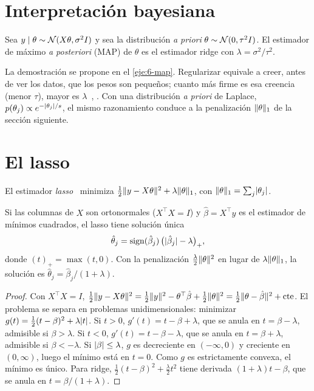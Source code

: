 \section{Interpretación bayesiana}

\begin{proposicion}\label{prop:map}
Sea $y\mid\theta\sim\mathcal{N}(X\theta,\sigma^{2}I)$ y sea la distribución \emph{a priori} $\theta\sim\mathcal{N}(0,\tau^{2}I)$. El estimador de máximo \emph{a posteriori} (MAP) de $\theta$ es el estimador ridge con $\lambda=\sigma^{2}/\tau^{2}$.
\end{proposicion}

La demostración se propone en el \cref{eje:6-map}. Regularizar equivale a creer, antes de ver los datos, que los pesos son pequeños; cuanto más firme es esa creencia (menor $\tau$), mayor es $\lambda$~\cite[§9.4]{cs229}, \cite[§3.1.4]{bishop}. Con una distribución \emph{a priori} de Laplace, $p(\theta_j)\propto e^{-\lvert\theta_j\rvert/s}$, el mismo razonamiento conduce a la penalización $\lVert\theta\rVert_1$ de la sección siguiente.

\section{El lasso}

\begin{definicion}[Lasso]
El estimador \emph{lasso}~\cite{lasso} minimiza $\frac12\lVert y-X\theta\rVert^{2}+\lambda\lVert\theta\rVert_1$, con $\lVert\theta\rVert_1=\sum_j\lvert\theta_j\rvert$.
\end{definicion}

\begin{proposicion}\label{prop:umbral}
Si las columnas de $X$ son ortonormales ($X^{\top}X=I$) y $\hat\beta=X^{\top}y$ es el estimador de mínimos cuadrados, el lasso tiene solución única
\[
\hat\theta_j=\operatorname{sign}(\hat\beta_j)\,\bigl(\lvert\hat\beta_j\rvert-\lambda\bigr)_{+},
\]
donde $(t)_{+}=\max(t,0)$. Con la penalización $\frac{\lambda}{2}\lVert\theta\rVert^{2}$ en lugar de $\lambda\lVert\theta\rVert_1$, la solución es $\hat\theta_j=\hat\beta_j/(1+\lambda)$.
\end{proposicion}

\begin{proof}
Con $X^{\top}X=I$, $\frac12\lVert y-X\theta\rVert^{2}=\frac12\lVert y\rVert^{2}-\theta^{\top}\hat\beta+\frac12\lVert\theta\rVert^{2}=\frac12\lVert\theta-\hat\beta\rVert^{2}+\text{cte}$. El problema se separa en problemas unidimensionales: minimizar $g(t)=\frac12(t-\beta)^{2}+\lambda\lvert t\rvert$. Si $t>0$, $g'(t)=t-\beta+\lambda$, que se anula en $t=\beta-\lambda$, admisible si $\beta>\lambda$. Si $t<0$, $g'(t)=t-\beta-\lambda$, que se anula en $t=\beta+\lambda$, admisible si $\beta<-\lambda$. Si $\lvert\beta\rvert\le\lambda$, $g$ es decreciente en $(-\infty,0)$ y creciente en $(0,\infty)$, luego el mínimo está en $t=0$. Como $g$ es estrictamente convexa, el mínimo es único. Para ridge, $\frac12(t-\beta)^{2}+\frac{\lambda}{2}t^{2}$ tiene derivada $(1+\lambda)t-\beta$, que se anula en $t=\beta/(1+\lambda)$.
\end{proof}

